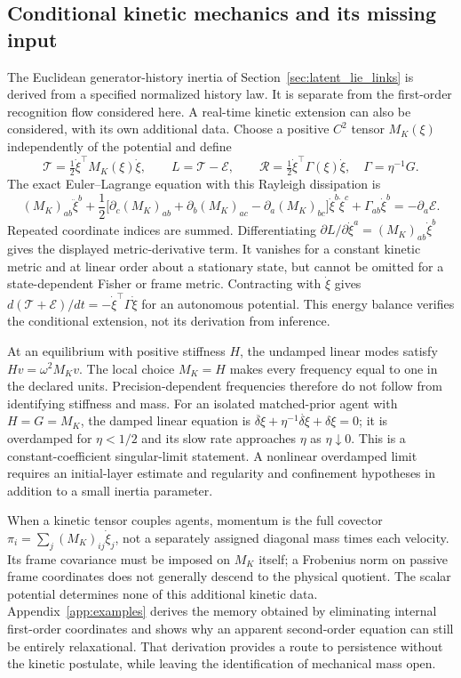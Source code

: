 \subsection{Conditional kinetic mechanics and its missing input}
\label{sec:velocity_quadratic}

The Euclidean generator-history inertia of Section~\ref{sec:latent_lie_links} is derived from a specified normalized history law. It is separate from the first-order recognition flow considered here. A real-time kinetic extension can also be considered, with its own additional data. Choose a positive $C^2$ tensor $M_K(\xi)$ independently of the potential and define
\begin{equation}
 \mathcal T=\tfrac12\dot\xi^\top M_K(\xi)\dot\xi,
 \qquad L=\mathcal T-\mathcal E,
 \qquad \mathcal R=\tfrac12\dot\xi^\top\Gamma(\xi)\dot\xi,
 \quad \Gamma=\eta^{-1}G.
 \label{eq:full_kinetic}
\end{equation}
The exact Euler--Lagrange equation with this Rayleigh dissipation is
\begin{equation}
 (M_K)_{ab}\ddot\xi^b+
 \frac12\big[\partial_c(M_K)_{ab}+\partial_b(M_K)_{ac}
 -\partial_a(M_K)_{bc}\big]\dot\xi^b\dot\xi^c
 +\Gamma_{ab}\dot\xi^b=-\partial_a\mathcal E.
 \label{eq:second_order_postulate}
\end{equation}
Repeated coordinate indices are summed. Differentiating
$\partial L/\partial\dot\xi^a=(M_K)_{ab}\dot\xi^b$ gives the displayed metric-derivative term. It vanishes for a constant kinetic metric and at linear order about a stationary state, but cannot be omitted for a state-dependent Fisher or frame metric. Contracting with $\dot\xi$ gives
$d(\mathcal T+\mathcal E)/dt=-\dot\xi^\top\Gamma\dot\xi$ for an autonomous potential. This energy balance verifies the conditional extension, not its derivation from inference.

At an equilibrium with positive stiffness $H$, the undamped linear modes satisfy
$Hv=\omega^2M_Kv$. The local choice $M_K=H$ makes every frequency equal to one in the declared units. Precision-dependent frequencies therefore do not follow from identifying stiffness and mass. For an isolated matched-prior agent with $H=G=M_K$, the damped linear equation is
$\ddot{\delta\xi}+\eta^{-1}\dot{\delta\xi}+\delta\xi=0$; it is overdamped for $\eta<1/2$ and its slow rate approaches $\eta$ as $\eta\downarrow0$. This is a constant-coefficient singular-limit statement. A nonlinear overdamped limit requires an initial-layer estimate and regularity and confinement hypotheses in addition to a small inertia parameter.

When a kinetic tensor couples agents, momentum is the full covector
$\pi_i=\sum_j(M_K)_{ij}\dot\xi_j$, not a separately assigned diagonal mass times each velocity. Its frame covariance must be imposed on $M_K$ itself; a Frobenius norm on passive frame coordinates does not generally descend to the physical quotient. The scalar potential determines none of this additional kinetic data. Appendix~\ref{app:examples} derives the memory obtained by eliminating internal first-order coordinates and shows why an apparent second-order equation can still be entirely relaxational. That derivation provides a route to persistence without the kinetic postulate, while leaving the identification of mechanical mass open.
